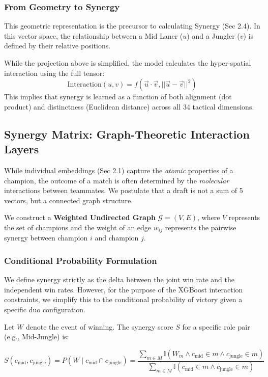 \documentclass[12pt, a4paper]{article}
\begin{document}
    \subsubsection{From Geometry to Synergy}
    This geometric representation is the precursor to calculating Synergy (Sec 2.4). In this vector space, the relationship between a Mid Laner ($u$) and a Jungler ($v$) is defined by their relative positions.

    While the projection above is simplified, the model calculates the hyper-spatial interaction using the full tensor:
    \begin{equation}
        \text{Interaction}(u, v) = f(\vec{u} \cdot \vec{v}, ||\vec{u} - \vec{v}||^2)
    \end{equation}
    This implies that synergy is learned as a function of both alignment (dot product) and distinctness (Euclidean distance) across all 34 tactical dimensions.

    \subsection{Synergy Matrix: Graph-Theoretic Interaction Layers}

    While individual embeddings (Sec 2.1) capture the \textit{atomic} properties of a champion, the outcome of a match is often determined by the \textit{molecular} interactions between teammates. We postulate that a draft is not a sum of 5 vectors, but a connected graph structure.

    We construct a \textbf{Weighted Undirected Graph} $\mathcal{G} = (V, E)$, where $V$ represents the set of champions and the weight of an edge $w_{ij}$ represents the pairwise synergy between champion $i$ and champion $j$.

    \subsubsection{Conditional Probability Formulation}
    We define synergy strictly as the delta between the joint win rate and the independent win rates. However, for the purpose of the XGBoost interaction constraints, we simplify this to the conditional probability of victory given a specific duo configuration.

    Let $W$ denote the event of winning. The synergy score $S$ for a specific role pair (e.g., Mid-Jungle) is:

    \begin{equation}
        S(c_{\text{mid}}, c_{\text{jungle}}) = P(W \mid c_{\text{mid}} \cap c_{\text{jungle}}) = \frac{\sum_{m \in M} \mathbb{I}(W_m \land c_{\text{mid}} \in m \land c_{\text{jungle}} \in m)}{\sum_{m \in M} \mathbb{I}(c_{\text{mid}} \in m \land c_{\text{jungle}} \in m)}
    \end{equation}
\end{document}
